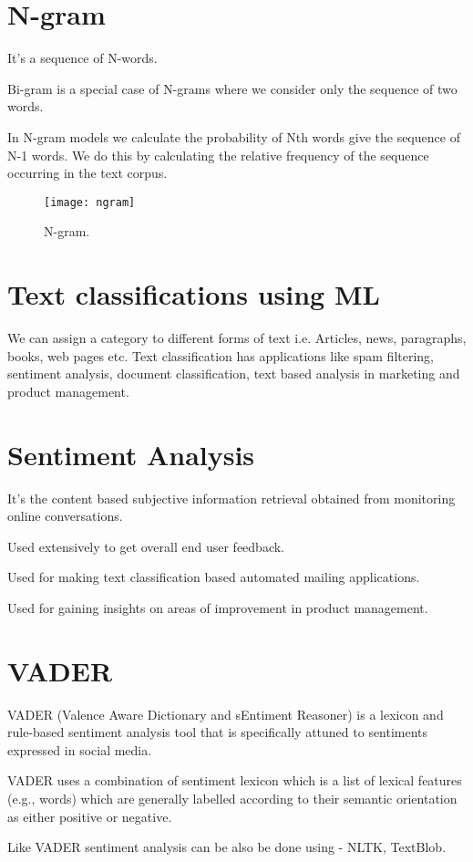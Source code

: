 	\section{N-gram}
	\begin{bulletedlist}
		\item It's a sequence of N-words.
		\item Bi-gram is a special case of N-grams where we consider only the sequence of two words.
		\item In N-gram models we calculate the probability of Nth words give the sequence of N-1 words. We do this by calculating the relative frequency of the sequence occurring in the text corpus.
	\end{bulletedlist}

	\begin{figure}[h]
		\centering
		\texttt{[image: ngram]}
		\caption[N-gram]{N-gram.}
		\label{fig:ngram}
	\end{figure}

	\section{Text classifications using ML}
We can assign a category to different forms of text i.e. Articles, news, paragraphs, books, web pages etc.  Text classification has applications like spam filtering, sentiment analysis, document classification, text based analysis in marketing and product management.

	\section{Sentiment Analysis}
	\begin{bulletedlist}
		\item It's the content based subjective information retrieval obtained from monitoring online conversations.
		\item Used extensively to get overall end user feedback.
		\item Used for making text classification based automated mailing applications.
		\item Used for gaining insights on areas of improvement in product management.
	\end{bulletedlist}

	\section{VADER}
	\begin{bulletedlist}
		\item VADER (Valence Aware Dictionary and sEntiment Reasoner) is a lexicon and rule-based sentiment analysis tool that is specifically attuned to sentiments expressed in social media.
		\item VADER uses a combination of sentiment lexicon which is a list of lexical features (e.g., words) which are generally labelled according to their semantic orientation as either positive or negative.
		\item Like VADER sentiment analysis can be also be done using - NLTK, TextBlob.
	\end{bulletedlist}

